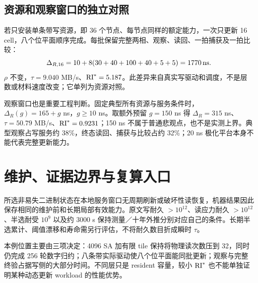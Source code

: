 \subsection{资源和观察窗口的独立对照}
若只安装单条带写资源，即 36 个节点、每节点同样的额定能力，一次只更新 16 cell，八个位平面顺序完成。每批保留完整两相、观察、读回、一拍捕获及一拍比较：
\[
\Delta_{R,16}=10+8(30+40+100+40+5+5)=1770\,\mathrm{ns}.
\]
$\rho$ 不变，$\tau=9.040$ MB/s、$\mathrm{RI}^*=5.187$。此差异来自真实写驱动和调度，不是层数或材料速度改变；它单列为资源对照。

观察窗口也是重要工程判断。固定典型所有资源与服务条件时，$\Delta_R(g)=165+g$ ns，$g\ge10$ ns。取额外预留 $g=150$ ns 得 $\Delta_R=315$ ns、$\tau=50.79$ MB/s、$\mathrm{RI}^*=0.9231$；150 ns 不属于普通悲观点，也不是实测上界。典型观察占写服务约 38\%，终态读回、捕获与比较占约 32\%；20 ns 极化平台本身不能代表完整更新能力。

\clearpage
\section{维护、证据边界与复算入口}

所选非易失二进制状态在本地服务窗口无周期刷新或破坏性读恢复，机器结果因此保存相同的维护前和长期局部有效能力。原文写耐久 $>10^{12}$、读应力耐久 $>10^{12}$、半选耐受 $10^9$ 以及约 3000 s 保持测量／十年外推分别对应自己的条件。长期半选累计、阈值漂移和寿命需另行评估，不将耐久数目折成瞬时 $\tau$。

本例位置主要由三项决定：4096 SA 加有限 tile 保持将物理读次数压到 32，同时仍完成 256 轮数字归约；八条带实际驱动使八个位平面能同批更新；观察与完整终验占据写侧的大部分时间。不同层只是 resident 容量，较小 $\mathrm{RI}^*$ 也不能单独证明某种动态更新 workload 的性能优势。

